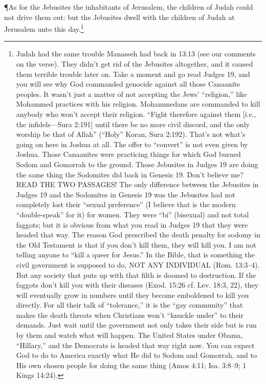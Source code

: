 \P \textcolor[rgb]{0.00,0.00,1.00}{As for the Jebusites the inhabitants of Jerusalem, the children of Judah could not drive them out: but the Jebusites dwell with the children of Judah at Jerusalem unto this day.}\footnote{Judah had the same trouble
Manasseh had back in 13:13 (see our comments
on the verse). They didn’t get rid of the
Jebusites altogether, and it caused them terrible
trouble later on.
Take a moment and go read Judges 19, and
you will see why God commanded genocide
against all those Canaanite peoples. It wasn’t
just a matter of not accepting the Jews’
“religion,” like Mohammed practices with his
religion. Mohammedans are commanded to kill
anybody who won’t accept their religion.
“Fight therefore against them [i.e., the
infidels—Sura 2:191] until there be no more
civil discord, and the only worship be that of
Allah” (“Holy” Koran, Sura 2:192).
That’s not what’s going on here in Joshua
at all. The offer to “convert” is not even given
by Joshua. Those Canaanites were practicing
things for which God burned Sodom and
Gomorrah to the ground. Those Jebusites in
Judges 19 are doing the same thing the
Sodomites did back in Genesis 19. Don’t
believe me? READ THE TWO PASSAGES!
The only difference between the Jebusites in
Judges 19 and the Sodomites in Genesis 19 was
the Jebusites had not completely lost their
“sexual preference” (I believe that is the modern
“double-speak” for it) for women. They were
“bi” (bisexual) and not total faggots; but it is
obvious from what you read in Judges 19 that
they were headed that way. The reason God
prescribed the death penalty for sodomy in the
Old Testament is that if you don’t kill them,
they will kill you. I am not telling anyone to “kill
a queer for Jesus.” In the Bible, that is
something the civil government is supposed to
do, NOT ANY INDIVIDUAL (Rom. 13:3–4).
But any society that puts up with that filth is
doomed to destruction.
If the faggots don’t kill you with their
diseases (Exod. 15:26 cf. Lev. 18:3, 22), they
will eventually grow in numbers until they
become emboldened to kill you directly. For all
their talk of “tolerance,” it is the “gay
community” that makes the death threats when
Christians won’t “knuckle under” to their
demands. Just wait until the government not
only takes their side but is run by them and
watch what will happen. The United States
under Obama, “Hillary,” and the Democrats is
headed that way right now. You can expect
God to do to America exactly what He did to
Sodom and Gomorrah, and to His own chosen
people for doing the same thing (Amos 4:11;
Isa. 3:8–9; 1 Kings 14:24).}
\newpage
